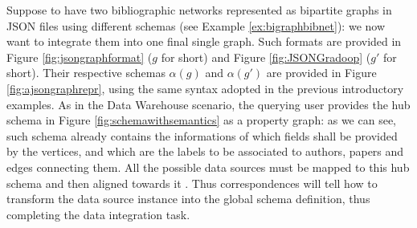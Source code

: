 \begin{example}[label=ex:examplegraphdata]
Suppose to have two bibliographic networks represented as bipartite graphs in JSON files using different schemas (see Example \vref{ex:bigraphbibnet}): we now want to integrate them into one final single graph. %
Such formats are provided in Figure \ref{fig:jsongraphformat} ($g$ for short) and Figure \ref{fig:JSONGradoop} ($g'$ for short). %
Their respective schemas $\alpha(g)$ and $\alpha(g')$ are  provided in Figure \ref{fig:ajsongraphrepr}, using the same syntax adopted in the previous introductory examples. %
As in the Data Warehouse scenario, the querying user provides the hub schema  \cite{GrossHKR11,HartungGR13}  in Figure \vref{fig:schemawithsemantics} as a property graph: as we can see, such schema already contains the informations of which fields shall be provided by the vertices, and which are the labels to be associated to authors, papers and  edges connecting them. %
All the possible data sources must be mapped to this hub schema and then aligned towards it %
\cite{euzenat2013d}. Thus correspondences will tell how to transform the data source instance into the global schema definition, thus completing the data integration task.


\end{example}
